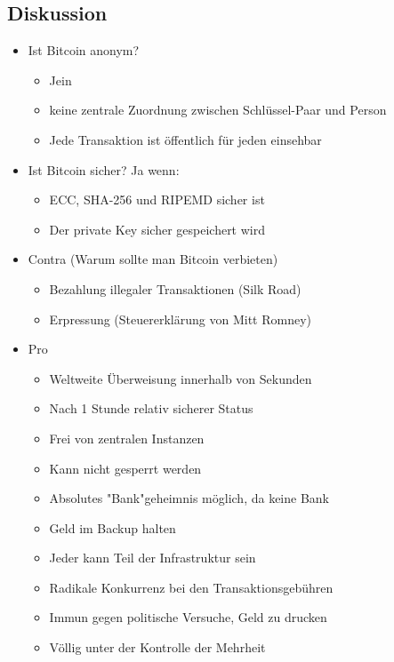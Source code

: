 \documentclass{article} %
\begin{document}
	\subsection{Diskussion}
			\begin{itemize}
			\item Ist Bitcoin anonym?
			\begin{itemize}
				\item Jein
				\item keine zentrale Zuordnung zwischen Schlüssel-Paar und Person 
				\item Jede Transaktion ist öffentlich für jeden einsehbar
			\end{itemize}
			\item Ist Bitcoin sicher? Ja wenn:
			\begin{itemize}
				\item ECC, SHA-256 und RIPEMD sicher ist
				\item Der private Key sicher gespeichert wird
			\end{itemize}
			\item Contra (Warum sollte man Bitcoin verbieten)
				\begin{itemize}
				 \item Bezahlung illegaler Transaktionen (Silk Road)
				 \item Erpressung (Steuererklärung von Mitt Romney)
				\end{itemize}
			\item Pro
				\begin{itemize}
				 \item Weltweite Überweisung innerhalb von Sekunden
				 \item Nach 1 Stunde relativ sicherer Status
				 \item Frei von zentralen Instanzen
				 \item Kann nicht gesperrt werden
				 \item Absolutes "Bank"geheimnis möglich, da keine Bank
				 \item Geld im Backup halten
				 \item Jeder kann Teil der Infrastruktur sein
				 \item Radikale Konkurrenz bei den Transaktionsgebühren
				 \item Immun gegen politische Versuche, Geld zu drucken
				 \item Völlig unter der Kontrolle der Mehrheit
				\end{itemize}
		\end{itemize}
\end{document}
